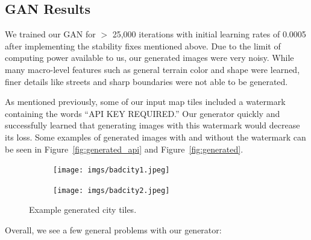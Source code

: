\documentclass[11pt,twocolumn,letterpaper]{article}
\begin{document}
\subsection{GAN Results}
We trained our GAN for $>$ 25,000 iterations with initial learning rates of 0.0005 after implementing the stability fixes mentioned above. Due to the limit of computing power available to us, our generated images were very noisy. While many macro-level features such as general terrain color and shape were learned, finer details like streets and sharp boundaries were not able to be generated.

As mentioned previously, some of our input map tiles included a watermark containing the words ``API KEY REQUIRED.'' Our generator quickly and successfully learned that generating images with this watermark would decrease its loss. Some examples of generated images with and without the watermark can be seen in Figure~\ref{fig:generated_api} and Figure~\ref{fig:generated}.

  \begin{figure}[ht]
    \centering
    \begin{subfigure}[b]{0.35\linewidth}
    \centering
        \texttt{[image: imgs/badcity1.jpeg]}
    \end{subfigure}
    \begin{subfigure}[b]{0.35\linewidth}
    \centering
        \texttt{[image: imgs/badcity2.jpeg]}
    \end{subfigure}    
        \caption{Example generated city tiles.}
        \label{fig:badcity}
\end{figure}

Overall, we see a few general problems with our generator:
\end{document}
